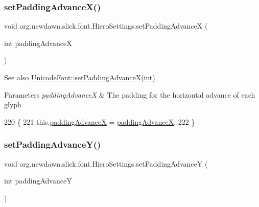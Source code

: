 \subsubsection{\texorpdfstring{set\+Padding\+Advance\+X()}{setPaddingAdvanceX()}}
{\footnotesize\ttfamily void org.\+newdawn.\+slick.\+font.\+Hiero\+Settings.\+set\+Padding\+AdvanceX (\begin{DoxyParamCaption}\item[{int}]{padding\+AdvanceX }\end{DoxyParamCaption})\hspace{0.3cm}{\ttfamily [inline]}}

\begin{DoxySeeAlso}{See also}
\mbox{\hyperlink{classorg_1_1newdawn_1_1slick_1_1_unicode_font_a90716509cbd8266db885d4068b7129fe}{Unicode\+Font\+::set\+Padding\+Advance\+X(int)}}
\end{DoxySeeAlso}

\begin{DoxyParams}{Parameters}
{\em padding\+AdvanceX} & The padding for the horizontal advance of each glyph \\
\hline
\end{DoxyParams}

\begin{DoxyCode}
220                                                         \{
221         this.\mbox{\hyperlink{classorg_1_1newdawn_1_1slick_1_1font_1_1_hiero_settings_a95bbfc376e37c8cbddb33d7e2fed2dd4}{paddingAdvanceX}} = \mbox{\hyperlink{classorg_1_1newdawn_1_1slick_1_1font_1_1_hiero_settings_a95bbfc376e37c8cbddb33d7e2fed2dd4}{paddingAdvanceX}};
222     \}
\end{DoxyCode}
\mbox{\label{classorg_1_1newdawn_1_1slick_1_1font_1_1_hiero_settings_a1085a06813f620e65cd29c3ecf9893d5}} 
\subsubsection{\texorpdfstring{set\+Padding\+Advance\+Y()}{setPaddingAdvanceY()}}
{\footnotesize\ttfamily void org.\+newdawn.\+slick.\+font.\+Hiero\+Settings.\+set\+Padding\+AdvanceY (\begin{DoxyParamCaption}\item[{int}]{padding\+AdvanceY }\end{DoxyParamCaption})\hspace{0.3cm}{\ttfamily [inline]}}

